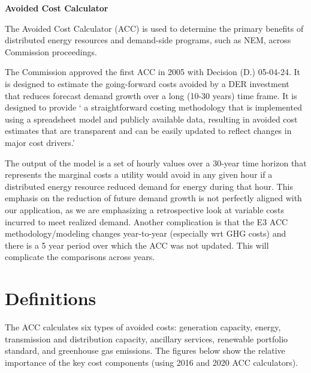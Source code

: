 \documentclass[11pt]{article}
\begin{document}
\textbf{Avoided Cost Calculator}

\bigskip

The Avoided Cost Calculator (ACC) is used to determine the primary benefits of distributed energy resources and demand-side programs, such as NEM, across Commission proceedings. 

\bigskip

The Commission approved the first ACC in 2005 with Decision (D.) 05-04-24.  It is designed to estimate the going-forward costs avoided by a DER investment that reduces forecast demand growth over a long (10-30 years) time frame. It is designed to provide ` a straightforward costing methodology that is implemented using a spreadsheet model and publicly available data, resulting in avoided cost estimates that are transparent and can be easily updated to reflect changes in major cost drivers.'  

\bigskip


The output of the model is a set of hourly values over a 30-year time horizon that represents the marginal costs a utility would avoid in any given hour if a distributed energy resource reduced demand for energy during that hour. This emphasis on the reduction of future demand growth  is not perfectly aligned with our application, as we are emphasizing a retrospective look at variable costs incurred to meet realized demand. Another complication is that the E3 ACC methodology/modeling changes year-to-year (especially wrt GHG costs) and there is a 5 year period over which the ACC was not updated. This will complicate the comparisons across years.  


\bigskip


\bigskip



\section{Definitions}

The ACC calculates six types of avoided costs: generation capacity, energy, transmission and distribution capacity, ancillary services, renewable portfolio standard, and greenhouse gas emissions. The figures below show the relative importance of the key cost components (using 2016 and 2020 ACC calculators).
\end{document}
